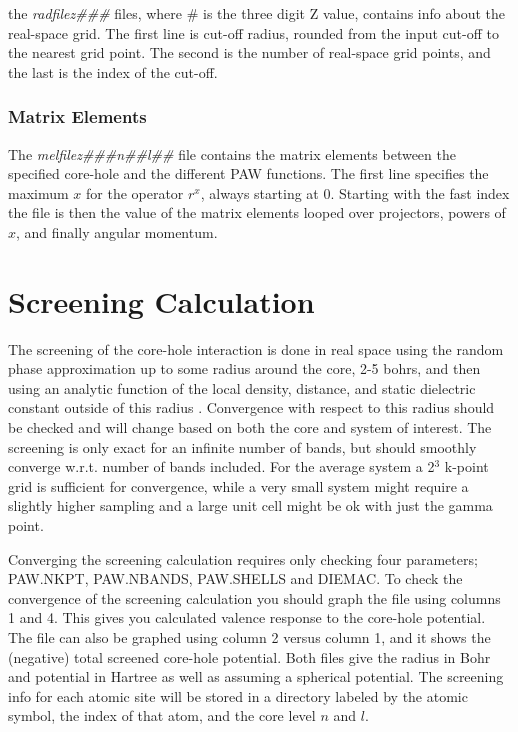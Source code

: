 \documentclass[11pt]{report}
\begin{document}
the \emph{radfilez\#\#\#} files, where \# is the three digit Z value, contains info about the real-space grid. The first line is cut-off radius, rounded from the input cut-off to the nearest grid point. The second is the number of real-space grid points, and the last is the index of the cut-off.

\subsection{Matrix Elements}

The \emph{melfilez\#\#\#n\#\#l\#\#} file contains the matrix elements between the specified core-hole and the different PAW functions. The first line specifies the maximum $x$ for the operator $r^x$, always starting at 0. Starting with the fast index the file is then the value of the matrix elements looped over projectors, powers of $x$, and finally angular momentum.

\chapter{Screening Calculation}
\label{screening}

The screening of the core-hole interaction is done in real space using the random phase approximation up to 
some radius around the core, 2-5 bohrs, and then using an analytic function of the local density, distance, 
and static dielectric constant outside of this radius \cite{screening}. Convergence with respect to this radius should be 
checked and will change based on both the core and system of interest. The screening is only exact for an 
infinite number of bands, but should smoothly converge w.r.t. number of bands included. For the average 
system a 2$^3$ k-point grid is sufficient for convergence, while a very small system might require a 
slightly higher sampling and a large unit cell might be ok with just the gamma point.

Converging the screening calculation requires only checking four parameters; PAW.NKPT, PAW.NBANDS, PAW.SHELLS and DIEMAC. To check the convergence of the screening calculation you should graph the file  using columns 1 and 4. This gives you calculated valence response to the core-hole potential. The file  can also be graphed using column 2 versus column 1, and it shows the (negative) total screened core-hole potential. Both files give the radius in Bohr and potential in Hartree as well as assuming a spherical potential. The screening info for each atomic site will be stored in a directory labeled by the atomic symbol, the index of that atom, and the core level $n$ and $l$.
\end{document}
